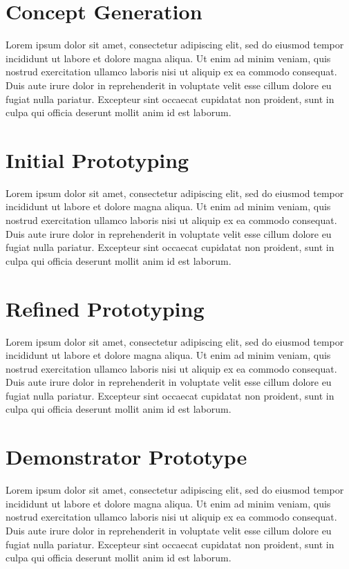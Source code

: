 \documentclass[a4,10pt,twocolumn]{article}
\begin{document}
\section*{Concept Generation}
Lorem ipsum dolor sit amet, consectetur adipiscing elit, sed do eiusmod tempor incididunt ut labore et dolore magna aliqua. Ut enim ad minim veniam, quis nostrud exercitation ullamco laboris nisi ut aliquip ex ea commodo consequat. Duis aute irure dolor in reprehenderit in voluptate velit esse cillum dolore eu fugiat nulla pariatur. Excepteur sint occaecat cupidatat non proident, sunt in culpa qui officia deserunt mollit anim id est laborum.

\section*{Initial Prototyping}
Lorem ipsum dolor sit amet, consectetur adipiscing elit, sed do eiusmod tempor incididunt ut labore et dolore magna aliqua. Ut enim ad minim veniam, quis nostrud exercitation ullamco laboris nisi ut aliquip ex ea commodo consequat. Duis aute irure dolor in reprehenderit in voluptate velit esse cillum dolore eu fugiat nulla pariatur. Excepteur sint occaecat cupidatat non proident, sunt in culpa qui officia deserunt mollit anim id est laborum.


\section*{Refined Prototyping}
Lorem ipsum dolor sit amet, consectetur adipiscing elit, sed do eiusmod tempor incididunt ut labore et dolore magna aliqua. Ut enim ad minim veniam, quis nostrud exercitation ullamco laboris nisi ut aliquip ex ea commodo consequat. Duis aute irure dolor in reprehenderit in voluptate velit esse cillum dolore eu fugiat nulla pariatur. Excepteur sint occaecat cupidatat non proident, sunt in culpa qui officia deserunt mollit anim id est laborum.

\section*{Demonstrator Prototype}

Lorem ipsum dolor sit amet, consectetur adipiscing elit, sed do eiusmod tempor incididunt ut labore et dolore magna aliqua. Ut enim ad minim veniam, quis nostrud exercitation ullamco laboris nisi ut aliquip ex ea commodo consequat. Duis aute irure dolor in reprehenderit in voluptate velit esse cillum dolore eu fugiat nulla pariatur. Excepteur sint occaecat cupidatat non proident, sunt in culpa qui officia deserunt mollit anim id est laborum.
\end{document}
